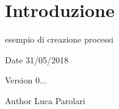 \hypertarget{index_intro}{}\section{Introduzione}\label{index_intro}
esempio di creazione processi~\newline
 \begin{DoxyDate}{Date}
31/05/2018 
\end{DoxyDate}
\begin{DoxyVersion}{Version}
0... 
\end{DoxyVersion}
\begin{DoxyAuthor}{Author}
Luca Parolari 
\end{DoxyAuthor}
